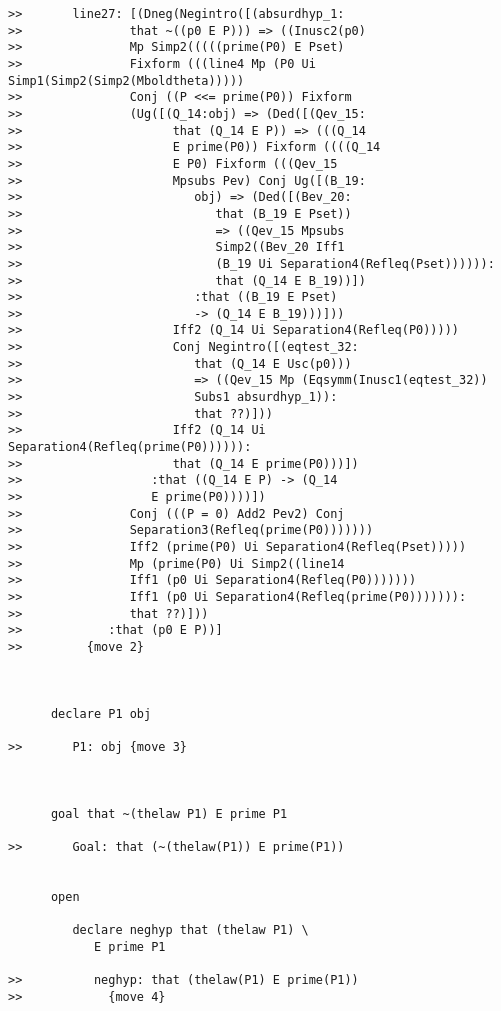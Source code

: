 \documentclass[12pt]{article}
\begin{document}
\begin{verbatim}
>>       line27: [(Dneg(Negintro([(absurdhyp_1:
>>               that ~((p0 E P))) => ((Inusc2(p0)
>>               Mp Simp2(((((prime(P0) E Pset)
>>               Fixform (((line4 Mp (P0 Ui Simp1(Simp2(Simp2(Mboldtheta)))))
>>               Conj ((P <<= prime(P0)) Fixform
>>               (Ug([(Q_14:obj) => (Ded([(Qev_15:
>>                     that (Q_14 E P)) => (((Q_14
>>                     E prime(P0)) Fixform ((((Q_14
>>                     E P0) Fixform (((Qev_15
>>                     Mpsubs Pev) Conj Ug([(B_19:
>>                        obj) => (Ded([(Bev_20:
>>                           that (B_19 E Pset))
>>                           => ((Qev_15 Mpsubs
>>                           Simp2((Bev_20 Iff1
>>                           (B_19 Ui Separation4(Refleq(Pset)))))):
>>                           that (Q_14 E B_19))])
>>                        :that ((B_19 E Pset)
>>                        -> (Q_14 E B_19)))]))
>>                     Iff2 (Q_14 Ui Separation4(Refleq(P0)))))
>>                     Conj Negintro([(eqtest_32:
>>                        that (Q_14 E Usc(p0)))
>>                        => ((Qev_15 Mp (Eqsymm(Inusc1(eqtest_32))
>>                        Subs1 absurdhyp_1)):
>>                        that ??)]))
>>                     Iff2 (Q_14 Ui Separation4(Refleq(prime(P0)))))):
>>                     that (Q_14 E prime(P0)))])
>>                  :that ((Q_14 E P) -> (Q_14
>>                  E prime(P0))))])
>>               Conj (((P = 0) Add2 Pev2) Conj
>>               Separation3(Refleq(prime(P0)))))))
>>               Iff2 (prime(P0) Ui Separation4(Refleq(Pset)))))
>>               Mp (prime(P0) Ui Simp2((line14
>>               Iff1 (p0 Ui Separation4(Refleq(P0)))))))
>>               Iff1 (p0 Ui Separation4(Refleq(prime(P0))))))):
>>               that ??)]))
>>            :that (p0 E P))]
>>         {move 2}



      declare P1 obj

>>       P1: obj {move 3}



      goal that ~(thelaw P1) E prime P1

>>       Goal: that (~(thelaw(P1)) E prime(P1))


      open

         declare neghyp that (thelaw P1) \
            E prime P1

>>          neghyp: that (thelaw(P1) E prime(P1))
>>            {move 4}




\end{verbatim}
\end{document}

